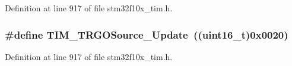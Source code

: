 Definition at line 917 of file stm32f10x\+\_\+tim.\+h.

\subsubsection[{\texorpdfstring{T\+I\+M\+\_\+\+T\+R\+G\+O\+Source\+\_\+\+Update}{TIM_TRGOSource_Update}}]{\setlength{\rightskip}{0pt plus 5cm}\#define T\+I\+M\+\_\+\+T\+R\+G\+O\+Source\+\_\+\+Update~(({\bf uint16\+\_\+t})0x0020)}\hypertarget{group___t_i_m___trigger___output___source_ga8a73c717070ab1a0ef90326780f20aef}{}\label{group___t_i_m___trigger___output___source_ga8a73c717070ab1a0ef90326780f20aef}


Definition at line 917 of file stm32f10x\+\_\+tim.\+h.

